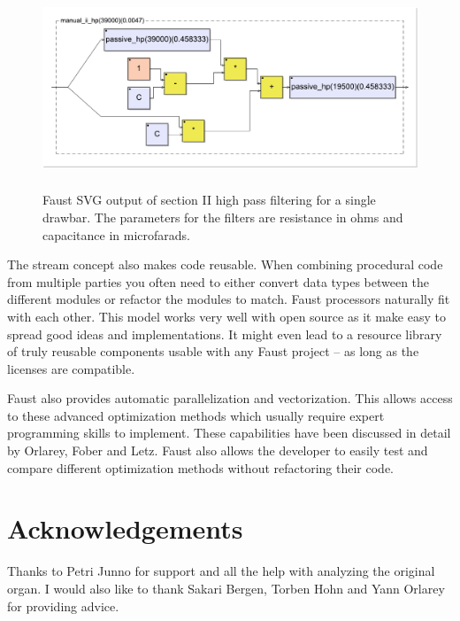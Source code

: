\documentclass[11pt,a4paper]{article}
\begin{document}
\begin{figure}[tbp]
\centering
\includegraphics[height=60mm,angle=270]{manual_ii_hp.pdf}
\caption{Faust SVG output of section II high pass filtering for a single drawbar. The parameters for the filters are resistance in ohms and capacitance in microfarads.}
\label{fig:manual_ii_hp}
\end{figure}

The stream concept also makes code reusable. When combining procedural code from multiple parties you often need to either convert data types between the different modules or refactor the modules to match. Faust processors naturally fit with each other. This model works very well with open source as it make easy to spread good ideas and implementations. It might even lead to a resource library of truly reusable components usable with any Faust project -- as long as the licenses are compatible.

Faust also provides automatic parallelization and vectorization. This allows access to these advanced optimization methods which usually require expert programming skills to implement. These capabilities have been discussed in detail by Orlarey, Fober and Letz\cite{orlarey:09a}. Faust also allows the developer to easily test and compare different optimization methods without refactoring their code.

\section{Acknowledgements}

Thanks to Petri Junno for support and all the help with analyzing the original organ. I would also like to thank Sakari Bergen, Torben Hohn and Yann Orlarey for providing advice.



\end{document}
